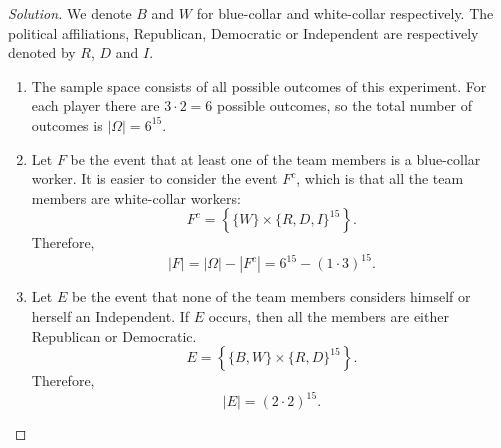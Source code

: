\documentclass{article}[12pt]
\newenvironment{solution}
  {\renewcommand\qedsymbol{$\blacksquare$}\begin{proof}[Solution]}
  {\end{proof}}
\begin{document}
\begin{solution}
 We denote $B$ and $W$ for blue-collar and white-collar respectively. 
 The political affiliations, Republican, Democratic or Independent are respectively denoted by $R$, $D$ and $I$.
\begin{enumerate}[label=(\alph*)]
    \item The sample space consists of all possible outcomes of this experiment.
    For each player there are $3\cdot 2 = 6$ possible outcomes, so the total number of outcomes is $|\Omega| = 6^{15}$.
    
    \item Let $F$ be the event that at least one of the team members is a blue-collar worker.
    It is easier to consider the event $F^{c}$, which is that all the team members are white-collar workers:
    \begin{equation*}
        F^{c} = \left\{\{W\}\times\{R, D, I\}^{15}\right\}.
    \end{equation*}
    Therefore,
    \begin{equation*}
        |F| = |\Omega| - |F^{c}| = 6^{15} - (1\cdot 3)^{15}.
    \end{equation*}
    
    \item Let $E$ be the event that none of the team members considers himself or herself an Independent. 
    If $E$ occurs, then all the members are either Republican or Democratic.
    \begin{equation*}
        E = \left\{\{B, W\}\times\{R, D\}^{15}\right\}.
    \end{equation*}
    Therefore,
    \begin{equation*}
        |E| = (2\cdot 2)^{15}.
    \end{equation*}
\end{enumerate}
\end{solution}
\end{document}
